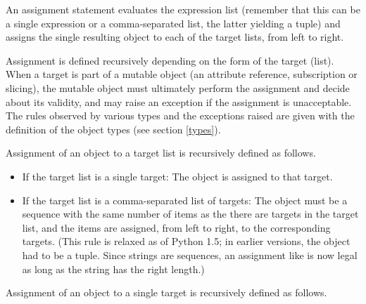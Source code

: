 An assignment statement evaluates the expression list (remember that
this can be a single expression or a comma-separated list, the latter
yielding a tuple) and assigns the single resulting object to each of
the target lists, from left to right.

Assignment is defined recursively depending on the form of the target
(list).  When a target is part of a mutable object (an attribute
reference, subscription or slicing), the mutable object must
ultimately perform the assignment and decide about its validity, and
may raise an exception if the assignment is unacceptable.  The rules
observed by various types and the exceptions raised are given with the
definition of the object types (see section \ref{types}).

Assignment of an object to a target list is recursively defined as
follows.

\begin{itemize}
\item
If the target list is a single target: The object is assigned to that
target.

\item
If the target list is a comma-separated list of targets: The object
must be a sequence with the same number of items as the there are
targets in the target list, and the items are assigned, from left to
right, to the corresponding targets.  (This rule is relaxed as of
Python 1.5; in earlier versions, the object had to be a tuple.  Since
strings are sequences, an assignment like  is
now legal as long as the string has the right length.)

\end{itemize}

Assignment of an object to a single target is recursively defined as
follows.

